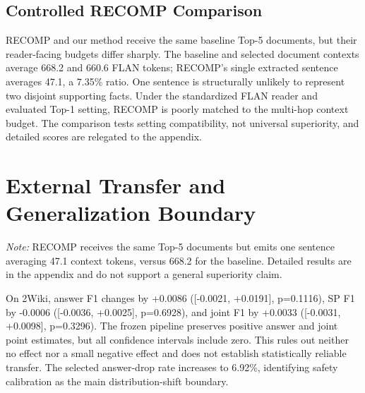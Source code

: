 \documentclass[10pt,twocolumn]{article}
\begin{document}
\subsection{Controlled RECOMP Comparison}

RECOMP and our method receive the same baseline Top-5 documents, but their reader-facing budgets differ sharply. The baseline and selected document contexts average 668.2 and 660.6 FLAN tokens; RECOMP's single extracted sentence averages 47.1, a 7.35\% ratio. One sentence is structurally unlikely to represent two disjoint supporting facts. Under the standardized FLAN reader and evaluated Top-1 setting, RECOMP is poorly matched to the multi-hop context budget. The comparison tests setting compatibility, not universal superiority, and detailed scores are relegated to the appendix.

\section{External Transfer and Generalization Boundary}

\begin{table}[t]
\centering
\small
\caption{Supporting comparisons}
\label{tab:4}
\end{table}

\noindent\textit{Note:} RECOMP receives the same Top-5 documents but emits one sentence averaging 47.1 context tokens, versus 668.2 for the baseline. Detailed results are in the appendix and do not support a general superiority claim.

On 2Wiki, answer F1 changes by +0.0086 ([-0.0021, +0.0191], p=0.1116), SP F1 by -0.0006 ([-0.0036, +0.0025], p=0.6928), and joint F1 by +0.0033 ([-0.0031, +0.0098], p=0.3296). The frozen pipeline preserves positive answer and joint point estimates, but all confidence intervals include zero. This rules out neither no effect nor a small negative effect and does not establish statistically reliable transfer. The selected answer-drop rate increases to 6.92\%, identifying safety calibration as the main distribution-shift boundary.
\end{document}

